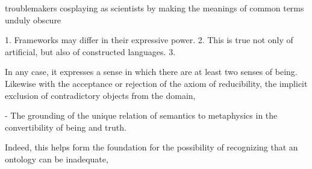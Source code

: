\documentclass[]{article}
\begin{document}
troublemakers cosplaying as scientists by making the meanings of common terms unduly obscure

1. Frameworks may differ in their expressive power.
2. This is true not only of artificial, but also of constructed languages.
3. 



In any case, it expresses a sense in which there are at least two senses of being. 
Likewise with the acceptance or rejection of the axiom of reducibility, 
the implicit exclusion of contradictory objects from the domain, 

- The grounding of the unique relation of semantics to metaphysics in the convertibility of being and truth.


Indeed, this helps form the foundation for the possibility of recognizing that an ontology can be inadequate, 


\end{document}
